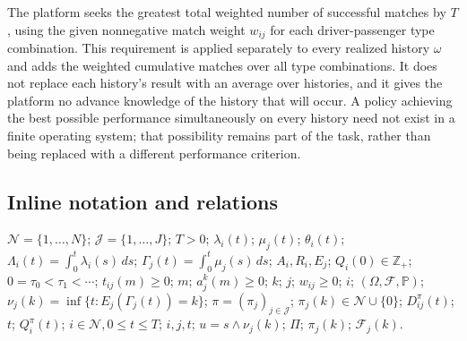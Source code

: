 \documentclass[10pt]{article}
\begin{document}
The platform seeks the greatest total weighted number of successful matches by $T$, using the given nonnegative match weight $w_{ij}$ for each driver-passenger type combination. This requirement is applied separately to every realized history $\omega$ and adds the weighted cumulative matches over all type combinations. It does not replace each history's result with an average over histories, and it gives the platform no advance knowledge of the history that will occur. A policy achieving the best possible performance simultaneously on every history need not exist in a finite operating system; that possibility remains part of the task, rather than being replaced with a different performance criterion.

\subsection*{Inline notation and relations}
$\mathcal N=\{1,\ldots,N\}$; $\mathcal J=\{1,\ldots,J\}$; $T>0$; $\lambda_i(t)$; $\mu_j(t)$; $\theta_i(t)$; $\Lambda_i(t)=\int_0^t\lambda_i(s)\,ds$; $\Gamma_j(t)=\int_0^t\mu_j(s)\,ds$; $A_i,R_i,E_j$; $Q_i(0)\in\mathbb Z_+$; $0=\tau_0<\tau_1<\cdots$; $t_{ij}(m)\ge0$; $m$; $a_j^k(m)\ge0$; $k$; $j$; $w_{ij}\ge0$; $i$; $(\Omega,\mathcal F,\mathbb P)$; $\nu_j(k)=\inf\{t:E_j(\Gamma_j(t))=k\}$; $\pi=(\pi_j)_{j\in\mathcal J}$; $\pi_j(k)\in\mathcal N\cup\{0\}$; $D_{ij}^\pi(t)$; $t$; $Q_i^\pi(t)$; $i\in\mathcal N,0\le t\le T$; $i,j,t$; $u=s\wedge\nu_j(k)$; $\Pi$; $\pi_j(k)$; $\mathcal F_j(k)$.
\end{document}
